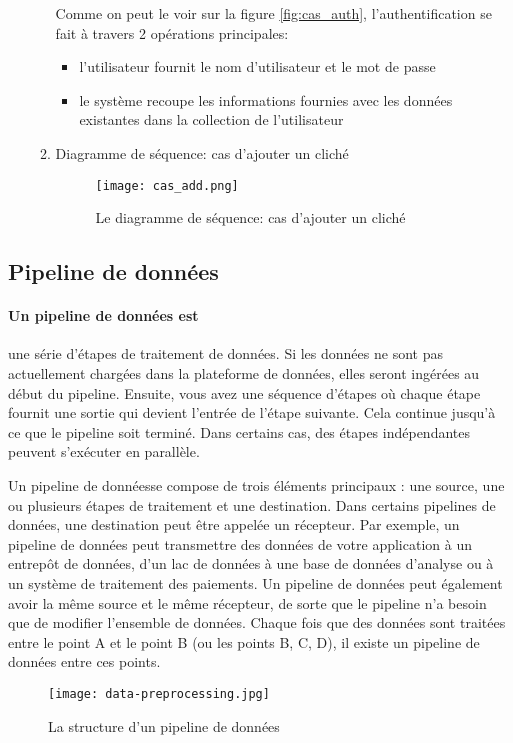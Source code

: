 \begin{enumerate}
\begin{enumerate}
                    Comme on peut le voir sur la figure \ref{fig:cas_auth}, l'authentification se fait à travers 2 opérations principales:
                    \begin{itemize}[label=$\bullet$]
                        \item l'utilisateur fournit le nom d'utilisateur et le mot de passe
                        \item le système recoupe les informations fournies avec les données existantes dans la collection de l'utilisateur
                    \end{itemize}
                    \item Diagramme de séquence: cas d'ajouter un cliché
                    \begin{figure}[H]
                        \centering
                        \texttt{[image: cas\_add.png]}
                        \caption{Le diagramme de séquence: cas d'ajouter un cliché}\label{fig:cas_add}
                    \end{figure}
                \end{enumerate}
            \end{enumerate}
        
    \subsection{Pipeline de données}\label{data_pipeline}
    \paragraph*{Un pipeline de données est} une série d'étapes de traitement de données. Si les données ne sont pas actuellement chargées dans la plateforme de données, elles seront ingérées au début du pipeline. Ensuite, vous avez une séquence d'étapes où chaque étape fournit une sortie qui devient l'entrée de l'étape suivante. Cela continue jusqu'à ce que le pipeline soit terminé. Dans certains cas, des étapes indépendantes peuvent s'exécuter en parallèle.  
    
    Un pipeline de donnéesse compose de trois éléments principaux : une source, une ou plusieurs étapes de traitement et une destination. Dans certains pipelines de données, une destination peut être appelée un récepteur. Par exemple, un pipeline de données peut transmettre des données de votre application à un entrepôt de données, d'un lac de données à une base de données d'analyse ou à un système de traitement des paiements. Un pipeline de données peut également avoir la même source et le même récepteur, de sorte que le pipeline n'a besoin que de modifier l'ensemble de données. Chaque fois que des données sont traitées entre le point A et le point B (ou les points B, C, D), il existe un pipeline de données entre ces points.
    \begin{figure}[H]
        \centering
        \texttt{[image: data-preprocessing.jpg]}
        \caption{La structure d'un pipeline de données}\label{fig:data_preprocessing}
    \end{figure}
